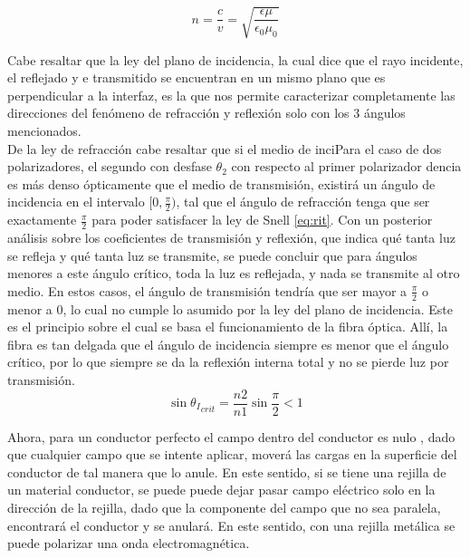 \documentclass[%
 reprint,
 amsmath,amssymb,
 aps,
]{revtex4-1}
\begin{document}
\begin{equation}
	n = \frac{c}{v} = \sqrt{\frac{\epsilon\mu}{\epsilon_0\mu_0}}
\label{indice}
\end{equation}

Cabe resaltar que la ley del plano de incidencia, la cual dice que el rayo incidente, el reflejado y e transmitido se encuentran en un mismo plano que es perpendicular a la interfaz, es la que nos permite caracterizar completamente las direcciones del fenómeno de refracción y reflexión solo con los 3 ángulos mencionados.\\

De la ley de refracción cabe resaltar que si el medio de inciPara el caso de dos polarizadores, el segundo con desfase $\theta_2$ con respecto al primer polarizador
dencia es más denso ópticamente que el medio de transmisión, existirá un ángulo de incidencia en el intervalo $[0,\frac{\pi}{2})$, tal que el ángulo de refracción tenga que ser exactamente $\frac{\pi}{2}$ para poder satisfacer la ley de Snell \ref{eq:rit}. Con un posterior análisis sobre los coeficientes de transmisión y reflexión, que indica qué tanta luz se refleja y qué tanta luz se transmite, se puede concluir que para ángulos menores a este ángulo crítico, toda la luz es reflejada, y nada se transmite al otro medio. En estos casos, el ángulo de transmisión tendría que ser mayor a $\frac{\pi}{2}$ o menor a $0$, lo cual no cumple lo asumido por la ley del plano de incidencia. Este es el principio sobre el cual se basa el funcionamiento de la fibra óptica. Allí, la fibra es tan delgada que el ángulo de incidencia siempre es menor que el ángulo crítico, por lo que siempre se da la reflexión interna total y no se pierde luz por transmisión.\\

\begin{equation}
	\sin{{\theta_I}_{crit}} = \frac{n2}{n1}\sin{\frac{\pi}{2}} < 1
\label{rit}
\end{equation}

Ahora, para un conductor perfecto el campo dentro del conductor es nulo \cite{griffiths}, dado que cualquier campo que se intente aplicar, moverá las cargas en la superficie del conductor de tal manera que lo anule. En este sentido, si se tiene una rejilla de un material conductor, se puede puede dejar pasar campo eléctrico solo en la dirección de la rejilla, dado que la componente del campo que no sea paralela, encontrará el conductor y se anulará. En este sentido, con una rejilla metálica se puede polarizar una onda electromagnética.\\
\end{document}
